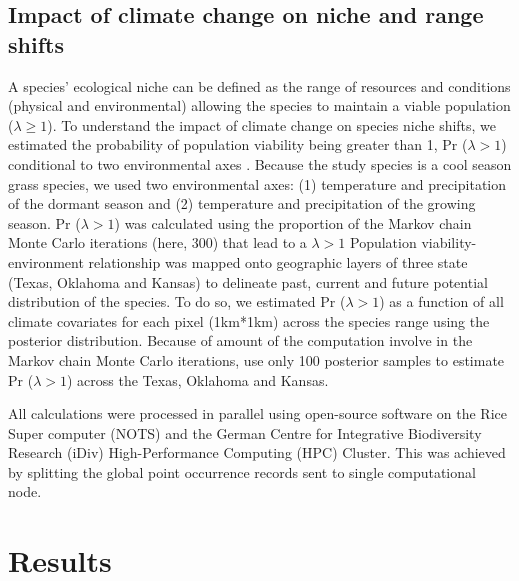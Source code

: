\documentclass[12pt]{article}
\begin{document}
\subsection*{Impact of climate change on niche and range shifts}
A species' ecological niche can be defined as the range of resources and conditions (physical and environmental) allowing the species to maintain a viable population ($\lambda \geq 1$).
To understand the impact of climate change on species niche shifts, we estimated the probability of  population viability being greater than  1, Pr ($\lambda > 1$) conditional to two environmental axes \citep{diez2014probabilistic}.
Because the study species is a cool season grass species, we used two environmental axes: (1) temperature and precipitation of the dormant season and (2) temperature and precipitation of the growing season. 
Pr ($\lambda > 1$) was calculated using the proportion of the Markov chain Monte Carlo iterations (here, 300) that lead to a $\lambda > 1$
Population viability-environment relationship was mapped onto geographic layers of three state (Texas, Oklahoma and Kansas) to delineate past, current and future potential distribution of the species.
To do so, we estimated Pr ($\lambda > 1$) as a function of all climate covariates for each pixel (1km*1km) across the species range using the posterior distribution. 
Because of amount of the computation involve in the Markov chain Monte Carlo iterations, use only 100 posterior samples to estimate Pr ($\lambda > 1$) across the Texas, Oklahoma and Kansas.

All calculations were processed in parallel using open-source software on the Rice Super computer (NOTS) and the German Centre for Integrative Biodiversity Research (iDiv) High-Performance Computing (HPC) Cluster. {\color{blue} This was achieved by splitting the global point occurrence records sent to single computational node}. 



\section*{Results}
\end{document}
